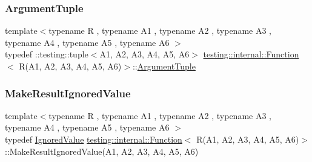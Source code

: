 \subsubsection{\texorpdfstring{ArgumentTuple}{ArgumentTuple}}
{\footnotesize\ttfamily template$<$typename R , typename A1 , typename A2 , typename A3 , typename A4 , typename A5 , typename A6 $>$ \\
typedef \+::testing\+::tuple$<$A1, A2, A3, A4, A5, A6$>$ \mbox{\hyperlink{structtesting_1_1internal_1_1_function}{testing\+::internal\+::\+Function}}$<$ R(A1, A2, A3, A4, A5, A6)$>$\+::\mbox{\hyperlink{structtesting_1_1internal_1_1_function_3_01_r_07_08_4_ad483c3128c470d8cdb55c3ac1c575c11}{Argument\+Tuple}}}

\mbox{\label{structtesting_1_1internal_1_1_function_3_01_r_07_a1_00_01_a2_00_01_a3_00_01_a4_00_01_a5_00_01_a6_08_4_a20c49ac827433a288921ca0caa0d319b}} 
\subsubsection{\texorpdfstring{MakeResultIgnoredValue}{MakeResultIgnoredValue}}
{\footnotesize\ttfamily template$<$typename R , typename A1 , typename A2 , typename A3 , typename A4 , typename A5 , typename A6 $>$ \\
typedef \mbox{\hyperlink{classtesting_1_1internal_1_1_ignored_value}{Ignored\+Value}} \mbox{\hyperlink{structtesting_1_1internal_1_1_function}{testing\+::internal\+::\+Function}}$<$ R(A1, A2, A3, A4, A5, A6)$>$\+::Make\+Result\+Ignored\+Value(A1, A2, A3, A4, A5, A6)}

\mbox{\label{structtesting_1_1internal_1_1_function_3_01_r_07_a1_00_01_a2_00_01_a3_00_01_a4_00_01_a5_00_01_a6_08_4_aa60c44ec945ca78297aaf7a3c785bce5}} 
